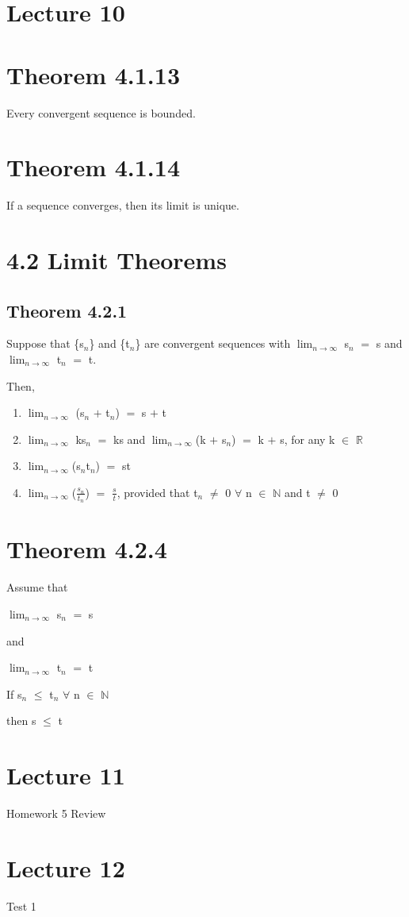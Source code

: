 \documentclass{article}
\newcommand{\mt}[1]{\ensuremath{#1}}
\newcommand\bsc[2][\DefaultOpt]{%
  \def\DefaultOpt{#2}%
  \section[#1]{#2}%
}
\newcommand\ssc[2][\DefaultOpt]{%
  \def\DefaultOpt{#2}%
  \subsection[#1]{#2}%
}
\newcommand{\balist}{\begin{enumerate}[label=\alph*.]}
\newcommand{\elist}{\end{enumerate}}
\newcommand{\br}{\mt{\mathbb{R}} }       %
\newcommand{\bn}{\mt{\mathbb{N}} }       %
\newcommand{\fa}{\mt{\forall} }          %
\newcommand{\mem}{\mt{\in} }
\newcommand{\eql}{\mt{=} }
\newcommand{\uw}[2]{#1\mt{_{#2}}}
\newcommand{\frc}[2]{\mt{\frac{#1}{#2}}}
\newcommand{\lmti}[1]{\mt{\displaystyle{\lim_{#1 \to \infty}}}}
\begin{document}
\bsc{Lecture 10}{
\bsc{Theorem 4.1.13}{

Every convergent sequence is bounded.
}

\bsc{Theorem 4.1.14}{

If a sequence converges, then its limit is unique.
}

\bsc{4.2 Limit Theorems}{

\ssc{Theorem 4.2.1}{

Suppose that \{\uw{s}{n}\} and \{\uw{t}{n}\} are convergent sequences with \lmti{n} \uw{s}{n} \eql s and \lmti{n} \uw{t}{n} \eql t.

Then,

\balist
\item \lmti{n} (\uw{s}{n} $+$ \uw{t}{n}) \eql s $+$ t
\item \lmti{n} k\uw{s}{n} \eql ks and \lmti{n}(k $+$ \uw{s}{n}) \eql k $+$ s, for any k \mem \br
\item \lmti{n}(\uw{s}{n}\uw{t}{n}) \eql st
\item \lmti{n}(\frc{\uw{s}{n}}{\uw{t}{n}}) \eql \frc{s}{t}, provided that \uw{t}{n} $\neq$ 0 \fa n \mem \bn and t $\neq$ 0
\elist

}

\bsc{Theorem 4.2.4}{

Assume that

\lmti{n} \uw{s}{n} \eql s

and

\lmti{n} \uw{t}{n} \eql t

If \uw{s}{n} $\leq$ \uw{t}{n} \fa n \mem \bn

then s $\leq$ t

}
}

}

\bsc{Lecture 11}{
Homework 5 Review
}

\bsc{Lecture 12}{
Test 1
}
\end{document}
